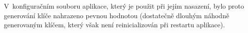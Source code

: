V~konfiguračním souboru aplikace, který je použit při jejím nasazení, bylo proto generování klíče nahrazeno pevnou hodnotou (dostatečně dlouhým náhodně generovaným klíčem, který však není reinicializován při restartu aplikace).



